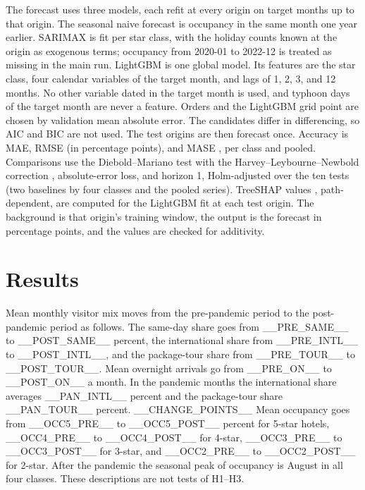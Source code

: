 \documentclass[11pt,a4paper]{article}
\begin{document}
The forecast uses three models, each refit at every origin on target months up to that origin. The seasonal naive forecast is occupancy in the same month one year earlier. SARIMAX is fit per star class, with the holiday counts known at the origin as exogenous terms; occupancy from 2020-01 to 2022-12 is treated as missing in the main run. LightGBM \cite{ke2017} is one global model. Its features are the star class, four calendar variables of the target month, and lags of 1, 2, 3, and 12 months. No other variable dated in the target month is used, and typhoon days of the target month are never a feature. Orders and the LightGBM grid point are chosen by validation mean absolute error. The candidates differ in differencing, so AIC and BIC are not used. The test origins are then forecast once. Accuracy is MAE, RMSE (in percentage points), and MASE \cite{hyndman2006}, per class and pooled. Comparisons use the Diebold--Mariano test \cite{diebold1995} with the Harvey--Leybourne--Newbold correction \cite{harvey1997}, absolute-error loss, and horizon 1, Holm-adjusted \cite{holm1979} over the ten tests (two baselines by four classes and the pooled series). TreeSHAP values \cite{lundberg2017}, path-dependent, are computed for the LightGBM fit at each test origin. The background is that origin's training window, the output is the forecast in percentage points, and the values are checked for additivity.

\section{Results}
Mean monthly visitor mix moves from the pre-pandemic period to the post-pandemic period as follows. The same-day share goes from __PRE_SAME__ to __POST_SAME__ percent, the international share from __PRE_INTL__ to __POST_INTL__, and the package-tour share from __PRE_TOUR__ to __POST_TOUR__. Mean overnight arrivals go from __PRE_ON__ to __POST_ON__ a month. In the pandemic months the international share averages __PAN_INTL__ percent and the package-tour share __PAN_TOUR__ percent. __CHANGE_POINTS__ Mean occupancy goes from __OCC5_PRE__ to __OCC5_POST__ percent for 5-star hotels, __OCC4_PRE__ to __OCC4_POST__ for 4-star, __OCC3_PRE__ to __OCC3_POST__ for 3-star, and __OCC2_PRE__ to __OCC2_POST__ for 2-star. After the pandemic the seasonal peak of occupancy is August in all four classes. These descriptions are not tests of H1--H3.
\end{document}
